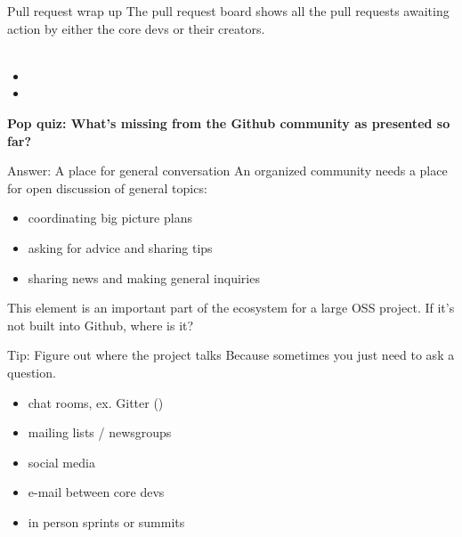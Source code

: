 \documentclass{beamer}
\begin{document}
\begin{frame}{Pull request wrap up}
	The pull request board shows all the pull requests awaiting action by either the core devs or their creators.\\[20pt]
	
	\\
	\begin{itemize}
		\item {}
		\item {}
	\end{itemize}
\end{frame}

\begin{frame}
	\centering
	\alert{\textbf{Pop quiz: What's missing from the Github community as presented so far?}}
\end{frame}

\begin{frame}{Answer: A place for general conversation}
	An organized community needs a place for open discussion of general topics:\\[4pt]
	\begin{itemize}
		\item coordinating big picture plans
		\item asking for advice and sharing tips
		\item sharing news and making general inquiries
	\end{itemize}
	\vskip12pt
	This element is an important part of the ecosystem for a large OSS project.  If it's not built into Github, where is it?
\end{frame}

\begin{frame}{Tip: Figure out where the project talks}
	Because sometimes you just need to ask a question.
	\\
	\begin{itemize}
		\item chat rooms, ex.\! Gitter ()
		\item mailing lists / newsgroups
		\item social media
		\item e-mail between core devs
		\item in person sprints or summits
	\end{itemize}
	\vskip4pt
\end{frame}
\end{document}
